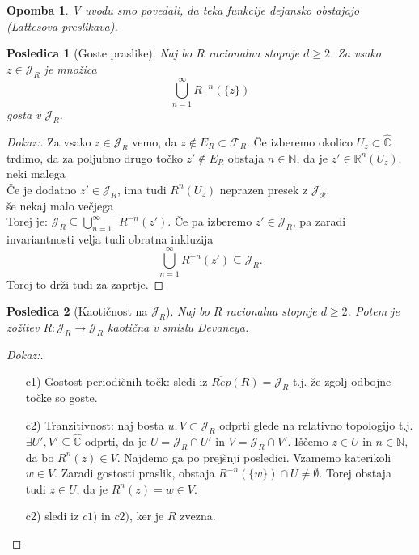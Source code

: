 \documentclass{article}
\newtheorem{posledica}{Posledica}
\newtheorem{opomba}{Opomba}
\newcommand{\C}{\mathbb{C}}
\newcommand{\N}{\mathbb{N}}
\newcommand{\R}{\mathbb{R}}
\begin{document}
\begin{opomba}
V uvodu smo povedali, da teka funkcije dejansko obstajajo (Lattesova preslikava).
\end{opomba}


\begin{posledica}[Goste praslike]
Naj bo $R$ racionalna stopnje $d \geq 2$. Za vsako $z\in \mathcal{J}_R$
je množica 
$$\bigcup_{n=1}^\infty R^{-n}(\{z\})$$
gosta v $\mathcal{J}_R$.
\end{posledica}

\begin{proof}[Dokaz:]
Za vsako $z \in \mathcal{J}_R$ vemo, da $z\not\in E_R \subset \mathcal{F}_R$.
Če izberemo okolico $U_z \subset \hat{\C}$ trdimo, da za poljubno 
drugo točko $z' \not\in E_R$ obstaja $n\in \N$, da je $z' \in \R^n(U_z)$.\\
neki malega\\
Če je dodatno $z' \in \mathcal{J}_R$, ima tudi $R^n(U_z)$ neprazen presek z 
$\mathcal{J_R}$.\\
še nekaj malo večjega\\
Torej je: $\mathcal{J}_R \subseteq \overline{\bigcup_{n=1}^\infty} R^{-n}(z')$.
Če pa izberemo $z' \in \mathcal{J}_R$, pa zaradi invariantnosti velja 
tudi obratna inkluzija
$$
\bigcup_{n=1}^\infty R^{-n}(z') \subseteq \mathcal{J}_R.
$$
Torej to drži tudi za zaprtje.
\end{proof}

\begin{posledica}[Kaotičnost na $\mathcal{J}_R$]
Naj bo $R$ racionalna stopnje $d \geq 2$. Potem je zožitev 
$R: \mathcal{J}_R \rightarrow \mathcal{J}_R$ kaotična v smislu 
Devaneya.
\end{posledica}

\begin{proof}[Dokaz:]
\begin{enumerate}
    \item[c1)] Gostost periodičnih točk: sledi iz $\overline{Rep}(R) = \mathcal{J}_R$
    t.j. že zgolj odbojne točke so goste.
    \item[c2)] Tranzitivnost: naj bosta $u, V \subset \mathcal{J}_R$ odprti 
    glede na relativno topologijo t.j. $\exists U', V' \subseteq \hat{\C}$
    odprti, da je $U = \mathcal{J}_R \cap U'$ in $V = \mathcal{J}_R \cap V'$. 
    Iščemo $z\in U$ in $n\in \N$, da bo $R^n(z) \in V$. Najdemo ga po prejšnji 
    posledici. Vzamemo katerikoli $w\in V$. Zaradi gostosti praslik, obstaja 
    $R^{-n}(\{w\}) \cap U \neq \emptyset$. Torej obstaja tudi $z\in U$, da je 
    $R^n(z) = w \in V$.
    \item[c2)] sledi iz $c1)$ in $c2)$, ker je $R$ zvezna.
\end{enumerate}
\end{proof}
\end{document}
